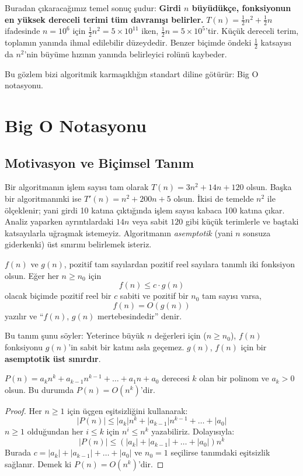 Buradan çıkaracağımız temel sonuç şudur: \textbf{Girdi $n$ büyüdükçe, fonksiyonun en yüksek dereceli terimi tüm davranışı belirler.} $T(n) = \frac{1}{2}n^2 + \frac{1}{2}n$ ifadesinde $n = 10^6$ için $\frac{1}{2}n^2 = 5 \times 10^{11}$ iken, $\frac{1}{2}n = 5 \times 10^5$'tir. Küçük dereceli terim, toplamın yanında ihmal edilebilir düzeydedir. Benzer biçimde öndeki $\frac{1}{2}$ katsayısı da $n^2$'nin büyüme hızının yanında belirleyici rolünü kaybeder.

Bu gözlem bizi algoritmik karmaşıklığın standart diline götürür: Big O notasyonu.

\section{Big O Notasyonu}

\subsection{Motivasyon ve Biçimsel Tanım}

Bir algoritmanın işlem sayısı tam olarak $T(n) = 3n^2 + 14n + 120$ olsun. Başka bir algoritmanınki ise $T'(n) = n^2 + 200n + 5$ olsun. İkisi de temelde $n^2$ ile ölçeklenir; yani girdi 10 katına çıktığında işlem sayısı kabaca 100 katına çıkar. Analiz yaparken ayrıntılardaki $14n$ veya sabit $120$ gibi küçük terimlerle ve baştaki katsayılarla uğraşmak istemeyiz. Algoritmanın \emph{asemptotik} (yani $n$ sonsuza giderkenki) üst sınırını belirlemek isteriz.

\begin{definition}
$f(n)$ ve $g(n)$, pozitif tam sayılardan pozitif reel sayılara tanımlı iki fonksiyon olsun. Eğer her $n \ge n_0$ için
\[ f(n) \le c \cdot g(n) \]
olacak biçimde pozitif reel bir $c$ sabiti ve pozitif bir $n_0$ tam sayısı varsa,
\[ f(n) = O(g(n)) \]
yazılır ve ``$f(n)$, $g(n)$ mertebesindedir'' denir.
\end{definition}

Bu tanım şunu söyler: Yeterince büyük $n$ değerleri için ($n \ge n_0$), $f(n)$ fonksiyonu $g(n)$'in sabit bir katını asla geçemez. $g(n)$, $f(n)$ için bir \textbf{asemptotik üst sınırdır}.

\begin{theorem}
$P(n) = a_k n^k + a_{k-1} n^{k-1} + \dots + a_1 n + a_0$ derecesi $k$ olan bir polinom ve $a_k > 0$ olsun. Bu durumda $P(n) = O(n^k)$'dir.
\end{theorem}

\begin{proof}
Her $n \ge 1$ için üçgen eşitsizliğini kullanarak:
\[ |P(n)| \le |a_k| n^k + |a_{k-1}| n^{k-1} + \dots + |a_0| \]
$n \ge 1$ olduğundan her $i \le k$ için $n^i \le n^k$ yazabiliriz. Dolayısıyla:
\[ |P(n)| \le (|a_k| + |a_{k-1}| + \dots + |a_0|) n^k \]
Burada $c = |a_k| + |a_{k-1}| + \dots + |a_0|$ ve $n_0 = 1$ seçilirse tanımdaki eşitsizlik sağlanır. Demek ki $P(n) = O(n^k)$'dir.
\end{proof}

